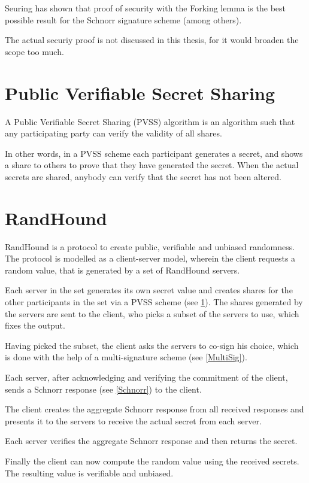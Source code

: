 Seuring has shown \cite{Seuring} that proof of security with the Forking lemma is the best possible result for the Schnorr signature scheme (among others).

The actual securiy proof is not discussed in this thesis, for it would broaden the scope too much.

\section{Public Verifiable Secret Sharing} \label{PVSS}
A Public Verifiable Secret Sharing (PVSS) \cite{PVSS} algorithm is an algorithm such that any participating party can verify the validity of all shares.

In other words, in a PVSS scheme each participant generates a secret, and shows a share to others to prove that they have generated the secret. When the actual secrets are shared, anybody can verify that the secret has not been altered.

\section{RandHound} \label{RandHound}
RandHound \cite{RandHound} is a protocol to create public, verifiable and unbiased randomness. The protocol is modelled as a client-server model, wherein the client requests a random value, that is generated by a set of RandHound servers.

Each server in the set generates its own secret value and creates shares for the other participants in the set via a PVSS scheme (see \ref{PVSS}). The shares generated by the servers are sent to the client, who picks a subset of the servers to use, which fixes the output.

Having picked the subset, the client asks the servers to co-sign his choice, which is done with the help of a multi-signature scheme (see \ref{MultiSig}).

Each server, after acknowledging and verifying the commitment of the client, sends a Schnorr response (see \ref{Schnorr}) to the client.

The client creates the aggregate Schnorr response from all received responses and presents it to the servers to receive the actual secret from each server.

Each server verifies the aggregate Schnorr response and then returns the secret.

Finally the client can now compute the random value using the received secrets. The resulting value is verifiable and unbiased.

